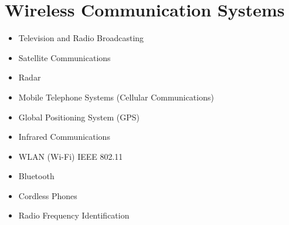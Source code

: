 \section*{Wireless Communication Systems}
\begin{itemize}
    \item Television and Radio Broadcasting
    \item Satellite Communications
    \item Radar
    \item Mobile Telephone Systems (Cellular Communications)
    \item Global Positioning System (GPS)
    \item Infrared Communications
    \item WLAN (Wi-Fi) IEEE 802.11
    \item Bluetooth
    \item Cordless Phones
    \item Radio Frequency Identification
\end{itemize}